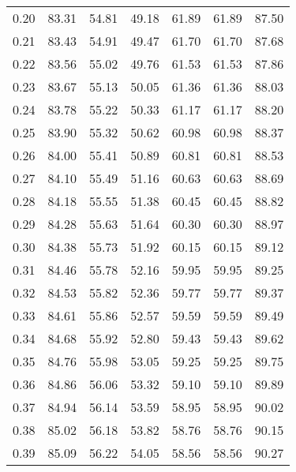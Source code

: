 \begin{tabular}{|c|c|c|c|c|c|c|}
      0.20 &     83.31 &     54.81 &      49.18 &   61.89 &      61.89 &         87.50 \\
      0.21 &     83.43 &     54.91 &      49.47 &   61.70 &      61.70 &         87.68 \\
      0.22 &     83.56 &     55.02 &      49.76 &   61.53 &      61.53 &         87.86 \\
      0.23 &     83.67 &     55.13 &      50.05 &   61.36 &      61.36 &         88.03 \\
      0.24 &     83.78 &     55.22 &      50.33 &   61.17 &      61.17 &         88.20 \\
      0.25 &     83.90 &     55.32 &      50.62 &   60.98 &      60.98 &         88.37 \\
      0.26 &     84.00 &     55.41 &      50.89 &   60.81 &      60.81 &         88.53 \\
      0.27 &     84.10 &     55.49 &      51.16 &   60.63 &      60.63 &         88.69 \\
      0.28 &     84.18 &     55.55 &      51.38 &   60.45 &      60.45 &         88.82 \\
      0.29 &     84.28 &     55.63 &      51.64 &   60.30 &      60.30 &         88.97 \\
      0.30 &     84.38 &     55.73 &      51.92 &   60.15 &      60.15 &         89.12 \\
      0.31 &     84.46 &     55.78 &      52.16 &   59.95 &      59.95 &         89.25 \\
      0.32 &     84.53 &     55.82 &      52.36 &   59.77 &      59.77 &         89.37 \\
      0.33 &     84.61 &     55.86 &      52.57 &   59.59 &      59.59 &         89.49 \\
      0.34 &     84.68 &     55.92 &      52.80 &   59.43 &      59.43 &         89.62 \\
      0.35 &     84.76 &     55.98 &      53.05 &   59.25 &      59.25 &         89.75 \\
      0.36 &     84.86 &     56.06 &      53.32 &   59.10 &      59.10 &         89.89 \\
      0.37 &     84.94 &     56.14 &      53.59 &   58.95 &      58.95 &         90.02 \\
      0.38 &     85.02 &     56.18 &      53.82 &   58.76 &      58.76 &         90.15 \\
      0.39 &     85.09 &     56.22 &      54.05 &   58.56 &      58.56 &         90.27 \\

\end{tabular}
